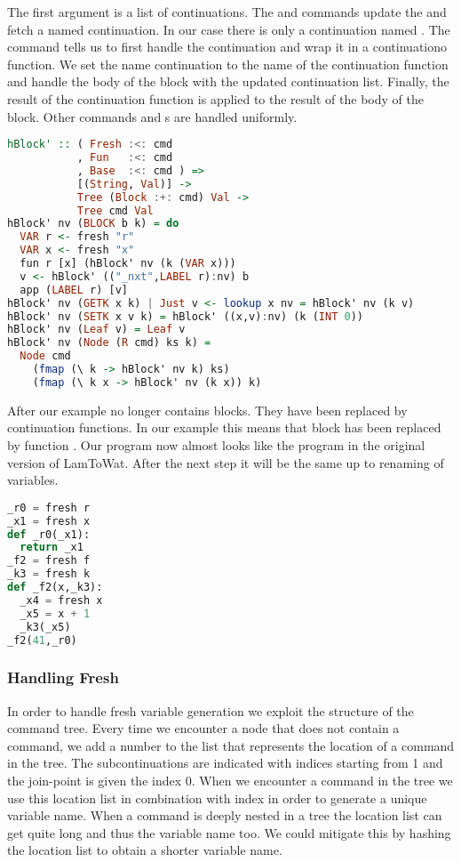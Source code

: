 The first argument  is a list of continuations. The  and  commands update the and fetch a named continuation. In our case there is only a continuation named . The  command tells us to first handle the continuation  and wrap it in a continuationo function. We set the name continuation  to the name of the continuation function and handle the body of the block with the updated continuation list. Finally, the result of the continuation function is applied to the result of the body of the block. Other commands and s are handled uniformly.

\begin{lstlisting}[language=Haskell]
hBlock' :: ( Fresh :<: cmd
           , Fun   :<: cmd
           , Base  :<: cmd ) =>
           [(String, Val)] ->
           Tree (Block :+: cmd) Val ->
           Tree cmd Val
hBlock' nv (BLOCK b k) = do
  VAR r <- fresh "r"
  VAR x <- fresh "x"
  fun r [x] (hBlock' nv (k (VAR x)))
  v <- hBlock' (("_nxt",LABEL r):nv) b
  app (LABEL r) [v]
hBlock' nv (GETK x k) | Just v <- lookup x nv = hBlock' nv (k v)
hBlock' nv (SETK x v k) = hBlock' ((x,v):nv) (k (INT 0))
hBlock' nv (Leaf v) = Leaf v
hBlock' nv (Node (R cmd) ks k) =
  Node cmd
    (fmap (\ k -> hBlock' nv k) ks)
    (fmap (\ k x -> hBlock' nv (k x)) k)
\end{lstlisting}

After  our example no longer contains blocks. They have been replaced by continuation functions. In our example this means that block  has been replaced by function . Our program now almost looks like the program in the original version of LamToWat. After the next step it will be the same up to renaming of variables.

\begin{lstlisting}[language=Python]
_r0 = fresh r
_x1 = fresh x
def _r0(_x1):
  return _x1
_f2 = fresh f
_k3 = fresh k
def _f2(x,_k3):
  _x4 = fresh x
  _x5 = x + 1
  _k3(_x5)
_f2(41,_r0)
\end{lstlisting}

\subsubsection{\label{subsection:hfresh}Handling Fresh}
In order to handle fresh variable generation we exploit the structure of the command tree. Every time we encounter a node that does not contain a  command, we add a number to the list  that represents the location of a command in the tree. The subcontinuations are indicated with indices starting from 1 and the join-point is given the index 0. When we encounter a  command in the tree we use this location list in combination with index  in order to generate a unique variable name. When a  command is deeply nested in a tree the location list can get quite long and thus the variable name too. We could mitigate this by hashing the location list to obtain a shorter variable name.

